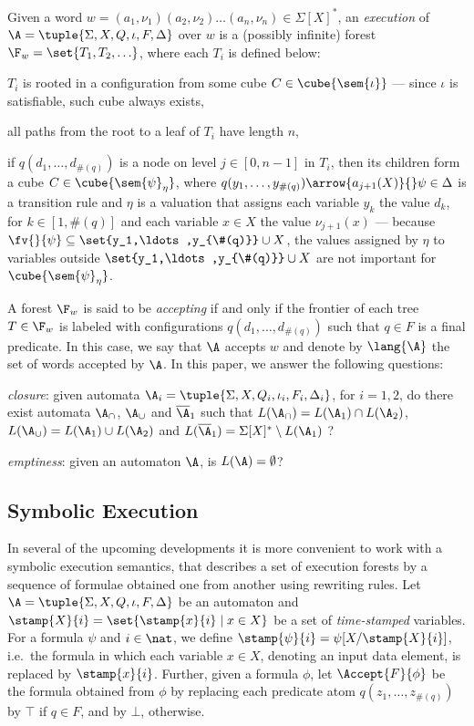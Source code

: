 \documentclass{llncs}
\begin{document}
Given a word $w=(a_1,\nu_1)(a_2,\nu_2) \ldots (a_n,\nu_n) \in
\Sigma[X]^*$, an \emph{execution} of
$\A=\tuple{\Sigma,X,Q,\iota,F,\Delta}$ over $w$ is a (possibly
infinite) forest $\F_w = \set{T_1,T_2,\ldots}$, where each $T_i$ is
defined below:
\begin{compactitem}
\item $T_i$ is rooted in a configuration from some cube $C \in
  \cube{\sem{\iota}}$ --- since $\iota$ is satisfiable, such cube
  always exists,
%
\item all paths from the root to a leaf of $T_i$ have length $n$,
%
\item if $q(d_1,\ldots,d_{\#(q)})$ is a node on level $j \in [0,n-1]$
  in $T_i$, then its children form a cube $C \in
  \cube{\sem{\psi}_\eta}$, where \(q(y_1,\ldots,y_{\#(q)})
  \arrow{a_{j+1}(X)}{} \psi \in \Delta\) is a transition rule and
  $\eta$ is a valuation that assigns each variable $y_k$ the value
  $d_k$, for $k \in [1,\#(q)]$ and each variable $x \in X$ the value
  $\nu_{j+1}(x)$ --- because $\fv{}{\psi} \subseteq
  \set{y_1,\ldots,y_{\#(q)}} \cup X$, the values assigned by $\eta$ to
  variables outside $\set{y_1,\ldots,y_{\#(q)}} \cup X$ are not
  important for $\cube{\sem{\psi}_\eta}$.
\end{compactitem}
A forest $\F_w$ is said to be \emph{accepting} if and only if the
frontier of each tree $T \in \F_w$ is labeled with configurations
$q(d_1,\ldots,d_{\#(q)})$ such that $q \in F$ is a final predicate. In
this case, we say that $\A$ accepts $w$ and denote by $\lang{\A}$ the
set of words accepted by $\A$. In this paper, we answer the following
questions: \begin{compactenum}
\item \emph{closure}: given automata $\A_i =
  \tuple{\Sigma,X,Q_i,\iota_i,F_i,\Delta_i}$, for $i=1,2$, do there
  exist automata $\A_\cap$, $\A_\cup$ and $\overline{\A}_1$ such that
  $L(\A_\cap) = L(\A_1) \cap L(\A_2)$, $L(\A_\cup) = L(\A_1) \cup
  L(\A_2)$ and $L(\overline{\A}_1) = \Sigma[X]^* \setminus L(\A_1)$ ?
%
\item \emph{emptiness}: given an automaton $\A$, is $L(\A) =
  \emptyset$?
\end{compactenum}

\subsection{Symbolic Execution}

In several of the upcoming developments it is more convenient to work
with a symbolic execution semantics, that describes a set of execution
forests by a sequence of formulae obtained one from another using
rewriting rules. Let $\A = \tuple{\Sigma,X,Q,\iota,F,\Delta}$ be an
automaton and $\stamp{X}{i} = \set{\stamp{x}{i} \mid x \in X}$ be a
set of \emph{time-stamped} variables. For a formula $\psi$ and $i \in
\nat$, we define $\stamp{\psi}{i} = \psi[X/\stamp{X}{i}]$, i.e.\ the
formula in which each variable $x \in X$, denoting an input data
element, is replaced by $\stamp{x}{i}$. Further, given a formula
$\phi$, let $\Accept{F}{\phi}$ be the formula obtained from $\phi$ by
replacing each predicate atom $q(z_1,\ldots,z_{\#(q)})$ by $\top$ if
$q \in F$, and by $\bot$, otherwise.
\end{document}
